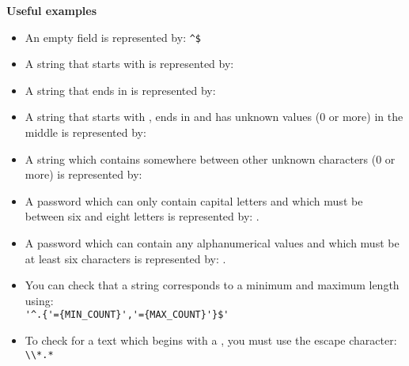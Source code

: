 \textbf{Useful examples}
\begin{itemize}
\item An empty field is represented by: \verb+^$+%
\item A string that starts with  is represented by: 
\item A string that ends in  is represented by: 
\item A string that starts with , ends in  and has unknown values (0 or more) in the middle is represented by: 
\item A string which contains  somewhere between other unknown characters (0 or more) is represented by: 
\item A password which can only contain capital letters and which must be between six and eight letters is represented by: .
\item A password which can contain any alphanumerical values and which must be at least six characters is represented by: .
\item You can check that a string corresponds to a minimum and maximum length using: \\
\verb#'^.{'={MIN_COUNT}','={MAX_COUNT}'}$'#
\item To check for a text which begins with a \bxshell{*}, you must use the escape character: \verb+\\*.*+
\end{itemize}

 



